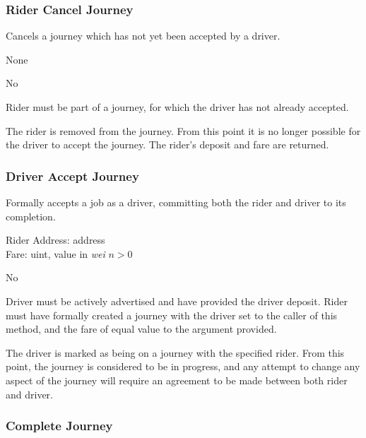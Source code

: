 \subsubsection{Rider Cancel Journey}

\begin{description}[leftmargin=8em,style=nextline]
	\item [Description]
		Cancels a journey which has not yet been accepted by a driver.
	\item [Arguments]
		None
	\item [Payable]
		No
	\item [Preconditions]
		Rider must be part of a journey, for which the driver has not already accepted.
	\item [Postconditions]
		The rider is removed from the journey. From this point it is no longer possible for the driver to accept the journey. The rider's deposit and fare are returned.
\end{description}

\subsubsection{Driver Accept Journey}

\begin{description}[leftmargin=8em,style=nextline]
	\item [Description]
		Formally accepts a job as a driver, committing both the rider and driver to its completion.
	\item [Arguments]
		Rider Address: address \\
		Fare: uint, value in \textit{wei} $n > 0$
	\item [Payable] 
		No
	\item [Preconditions]
		Driver must be actively advertised and have provided the driver deposit. Rider must have formally created a journey with the driver set to the caller of this method, and the fare of equal value to the argument provided.
	\item [Postconditions]
		The driver is marked as being on a journey with the specified rider. From this point, the journey is considered to be in progress, and any attempt to change any aspect of the journey will require an agreement to be made between both rider and driver.
\end{description}

\subsubsection{Complete Journey}

